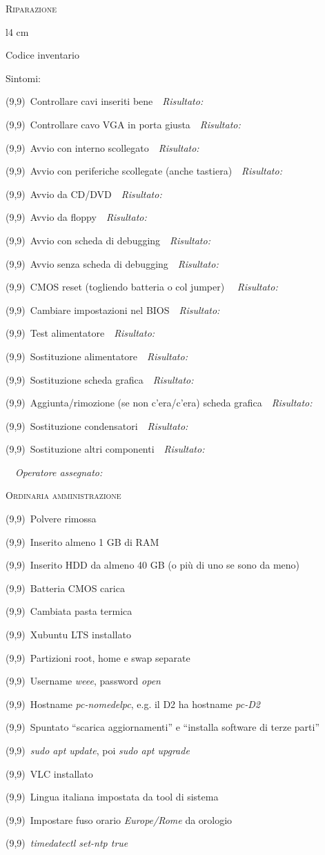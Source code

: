 \documentclass[a4paper,12pt,twoside]{article}
\newcommand{\rulespace}[1]{\ \ \textit{\small #1} \hrulefill\par}
\renewcommand{\r}{\rulespace{Risultato:}}
\renewcommand{\c}{\framebox(9,9){}\, }
\newcommand{\ci}{\hspace{1cm}\c} %
\begin{document}
\thispagestyle{empty}
{\Large\textsc{Riparazione}}\par
\begin{wrapfigure}{l}{4 cm}
	\vspace{-0.5cm}
	\begin{framed}
		\begin{centering}
		{\footnotesize Codice inventario\par}
		\vspace{2.4cm}
		\end{centering}		
	\end{framed}
	\vspace{-1.4cm}
\end{wrapfigure}
Sintomi: \hrulefill\par
\hrulefill\par
\c Controllare cavi inseriti bene\r
\c Controllare cavo VGA in porta giusta\r
\c Avvio con interno scollegato\r
\c Avvio con periferiche scollegate (anche tastiera)\r
\c Avvio da CD/DVD\r
\c Avvio da floppy\r
\c Avvio con scheda di debugging\r
\c Avvio senza scheda di debugging\r
\c CMOS reset (togliendo batteria o col jumper) \r
\c Cambiare impostazioni nel BIOS\r
\c Test alimentatore\r
\c Sostituzione alimentatore\r
\c Sostituzione scheda grafica\r
\c Aggiunta/rimozione (se non c'era/c'era) scheda grafica\r
\c Sostituzione condensatori\r
\c Sostituzione altri componenti\r
\rulespace{Operatore assegnato:}
{\Large\textsc{Ordinaria amministrazione}}\par
\c Polvere rimossa\par
\c Inserito almeno 1 GB di RAM\par
\c Inserito HDD da almeno 40 GB (o più di uno se sono da meno)\par
\c Batteria CMOS carica\par
\c Cambiata pasta termica\par
\c Xubuntu LTS installato\par
\ci Partizioni root, home e swap separate\par
\ci Username \textit{weee}, password \textit{open}\par
\ci Hostname \textit{pc-nomedelpc}, e.g. il D2 ha hostname \textit{pc-D2}\par
\ci Spuntato ``scarica aggiornamenti'' e ``installa software di terze parti''\par
\ci \textit{sudo apt update}, poi \textit{sudo apt upgrade}\par
\ci VLC installato\par
\ci Lingua italiana impostata da tool di sistema\par
\ci Impostare fuso orario \textit{Europe/Rome} da orologio\par
\ci \textit{timedatectl set-ntp true}\par
\end{document}
